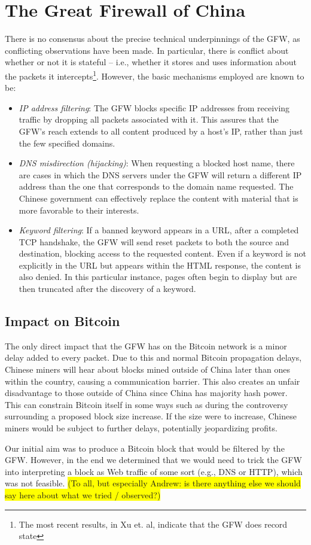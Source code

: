 \section{The Great Firewall of China}
There is no consensus about the precise technical underpinnings of the GFW, as conflicting observations have been made. In particular, there is conflict about whether or not it is stateful -- i.e., whether it stores and uses information about the packets it intercepts\footnote{The most recent results, in Xu et. al\cite{Xu2011}, indicate that the GFW does record state}. However, the basic mechanisms employed are known to be\cite{GFWStanford}:

\begin{itemize}
\item \textit{IP address filtering}:
The GFW blocks specific IP addresses from receiving traffic by dropping all packets associated with it. This assures that the GFW's reach extends to all content produced by a host's IP, rather than just the few specified domains.

\item \textit{DNS misdirection (hijacking)}:
When requesting a blocked host name, there are cases in which the DNS servers under the GFW will return a different IP address than the one that corresponds to the domain name requested. The Chinese government can effectively replace the content with material that is more favorable to their interests.

\item \textit{Keyword filtering}:
If a banned keyword appears in a URL, after a completed TCP handshake, the GFW will send reset packets to both the source and destination, blocking access to the requested content. Even if a keyword is not explicitly in the URL but appears within the HTML response, the content is also denied. In this particular instance, pages often begin to display but are then truncated after the discovery of a keyword.
\end{itemize}

\subsection{Impact on Bitcoin}
The only direct impact that the GFW has on the Bitcoin network is a minor delay added to every packet. Due to this and normal Bitcoin propagation delays, Chinese miners will hear about blocks mined outside of China later than ones within the country, causing a communication barrier. This also creates an unfair disadvantage to those outside of China since China has majority hash power. This can constrain Bitcoin itself in some ways such as during the controversy surrounding a proposed block size increase. If the size were to increase, Chinese miners would be subject to further delays, potentially jeopardizing profits. \cite{nasdaq}

Our initial aim was to produce a Bitcoin block that would be filtered by the GFW. However, in the end we determined that we would need to trick the GFW into interpreting a block as Web traffic of some sort (e.g., DNS or HTTP), which was not feasible. \colorbox{yellow}{(To all, but especially Andrew: is there anything else we should say here about what we tried / observed?)}